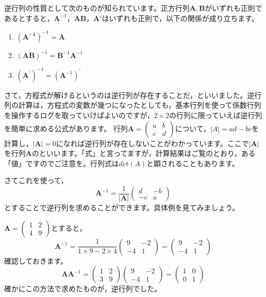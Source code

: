 \documentclass{ltjsbook}
\begin{document}
逆行列の性質として次のものが知られています。正方行列$\bm{A},\bm{B}$がいずれも正則であるとすると，$\bm{A}^{-1}$，$\bm{AB}$，$\bm{A}'$はいずれも正則で，以下の関係が成り立ちます。
\begin{enumerate}
	\item $(\bm{A^{-1}})^{-1} = \bm{A}$
	\item $(\bm{AB})^{-1} = \bm{B}^{-1}\bm{A}^{-1}$
	\item $(\bm{A}^\prime )^{-1} = (\bm{A}^{-1})^{\prime}$
\end{enumerate}

さて，方程式が解けるというのは逆行列が存在することだ，といいました。逆行列の計算は，方程式の変数が幾つになったとしても，基本行列を使って係数行列を操作するログを取っていけばよいのですが，$2 \times 2$の行列に限っていえば逆行列を簡単に求める公式があります。
\label{inverse_form}
行列$\bm{A} = \begin{pmatrix} a & b \\ c & d \end{pmatrix}$について，$|A| = ad-bc$を計算し，$|\bm{A}|=0$になれば逆行列が存在しないことがわかっています。ここで$|\bm{A}|$を行列$\bm{A}$のといいます。「式」と言ってますが，計算結果はご覧のとおり，ある「値」ですのでご注意を。行列式は$det(A)$と顕されることもあります。

さてこれを使って，
\[ \bm{A}^{-1} = \frac{1}{|\bm{A}|}\begin{pmatrix} d & -b \\ -c & a \end{pmatrix} \]
とすることで逆行列を求めることができます。具体例を見てみましょう。

$\bm{A} = \begin{pmatrix} 1 & 2 \\ 4 & 9 \end{pmatrix}$とすると，
\[ \bm{A}^{-1} = \frac{1}{1\times 9 - 2 \times 4}\begin{pmatrix} 9 & -2 \\ -4 & 1 \end{pmatrix}  = \begin{pmatrix}9 & -2 \\ -4 & 1\end{pmatrix}\]
確認しておきます。
\[ \bm{AA}^{-1} = \begin{pmatrix} 1 & 2 \\ 3 & 9 \end{pmatrix} \begin{pmatrix}9 & -2 \\ -4 & 1\end{pmatrix} = \begin{pmatrix} 1 & 0 \\ 0 & 1 \end{pmatrix} \]
確かにこの方法で求めたものが，逆行列でした。
\end{document}
